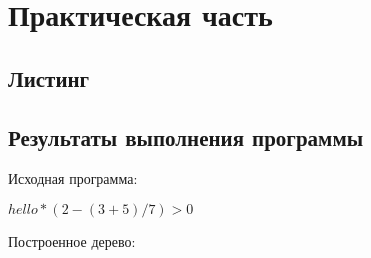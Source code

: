 \chapter{Практическая часть}

\section{Листинг}


%
%
%
%
%

\newpage

\section{Результаты выполнения программы}

Исходная программа:

$hello*(2 - (3 + 5)/7) > 0$

Построенное дерево:

